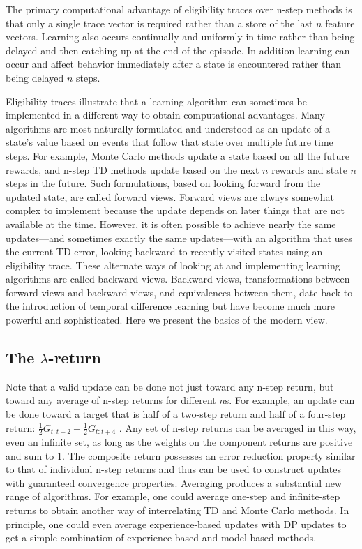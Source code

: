\documentclass{article}
\begin{document}
The primary computational advantage of eligibility traces over n-step methods is that only a single trace vector is required rather than a store of the last $n$ feature vectors. Learning also occurs continually and uniformly in time rather than being delayed and then catching up at the end of the episode. 
In addition learning can occur and affect behavior immediately after a state is encountered rather than being delayed $n$ steps.

Eligibility traces illustrate that a learning algorithm can sometimes be implemented in a different way to obtain computational advantages. Many algorithms are most naturally formulated and understood as an update of a state's value based on events that follow that state over multiple future time steps. 
For example, Monte Carlo methods update a state based on all the future rewards, and n-step TD methods update based on the next $n$ rewards and state $n$ steps in the future. Such formulations, based on looking forward from the updated state, are called forward views. Forward views are always somewhat complex 
to implement because the update depends on later things that are not available at the time. However, it is often possible to achieve nearly the same updates—and sometimes exactly the same updates—with an algorithm that uses the current TD error, looking backward to recently visited states 
using an eligibility trace. These alternate ways of looking at and implementing learning algorithms are called backward views. Backward views, transformations between forward views and backward views, and equivalences between them, date back to the introduction of temporal difference learning but have become much more powerful and sophisticated. 
Here we present the basics of the modern view.

\subsection{The \texorpdfstring{$\lambda$}{lambda}-return}

Note that a valid update can be done not just toward any n-step return, but toward any average of n-step returns for different $n$s. For example, an update can be done toward a target that is half of a two-step return and half of a four-step return: $\textstyle { \frac { 1 } { 2 } } G _ { t : t + 2 } + { \frac { 1 } { 2 } } G _ { t : t + 4 }$ . 
Any set of n-step returns can be averaged in this way, even an infinite set, as long as the weights on the component returns are positive and sum to 1. The composite return possesses an error reduction property similar to that of individual n-step returns and thus can be used to construct updates with guaranteed convergence properties. 
Averaging produces a substantial new range of algorithms. For example, one could average one-step and infinite-step returns to obtain another way of interrelating TD and Monte Carlo methods. In principle, one could even average experience-based updates with DP updates to get a simple combination of experience-based and model-based methods.
\end{document}
